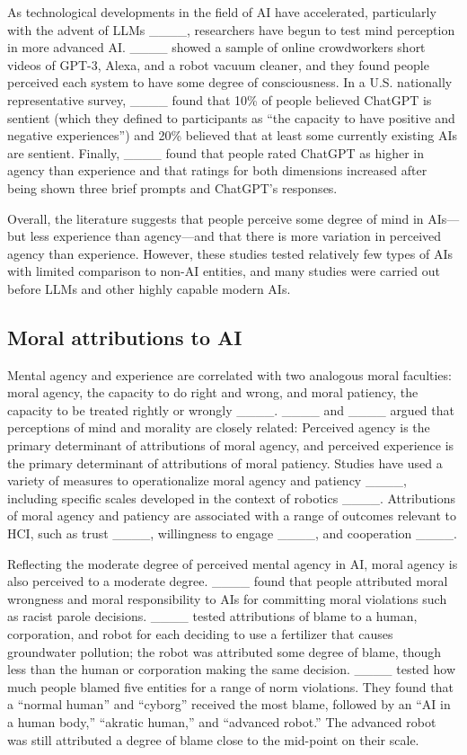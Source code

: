 As technological developments in the field of AI have accelerated, particularly with the advent of LLMs ____, researchers have begun to test mind perception in more advanced AI. ____ showed a sample of online crowdworkers short videos of GPT-3, Alexa, and a robot vacuum cleaner, and they found people perceived each system to have some degree of consciousness. In a U.S. nationally representative survey, ____ found that 10\% of people believed ChatGPT is sentient (which they defined to participants as “the capacity to have positive and negative experiences”) and 20\% believed that at least some currently existing AIs are sentient. Finally, ____ found that people rated ChatGPT as higher in agency than experience and that ratings for both dimensions increased after being shown three brief prompts and ChatGPT’s responses.

Overall, the literature suggests that people perceive some degree of mind in AIs—but less experience than agency—and that there is more variation in perceived agency than experience. However, these studies tested relatively few types of AIs with limited comparison to non-AI entities, and many studies were carried out before LLMs and other highly capable modern AIs.

\subsection{Moral attributions to AI}

Mental agency and experience are correlated with two analogous moral faculties: moral agency, the capacity to do right and wrong, and moral patiency, the capacity to be treated rightly or wrongly ____. ____ and ____ argued that perceptions of mind and morality are closely related: Perceived agency is the primary determinant of attributions of moral agency, and perceived experience is the primary determinant of attributions of moral patiency. Studies have used a variety of measures to operationalize moral agency and patiency ____, including specific scales developed in the context of robotics ____. Attributions of moral agency and patiency are associated with a range of outcomes relevant to HCI, such as trust ____, willingness to engage ____, and cooperation ____.

Reflecting the moderate degree of perceived mental agency in AI, moral agency is also perceived to a moderate degree. ____ found that people attributed moral wrongness and moral responsibility to AIs for committing moral violations such as racist parole decisions. ____ tested attributions of blame to a human, corporation, and robot for each deciding to use a fertilizer that causes groundwater pollution; the robot was attributed some degree of blame, though less than the human or corporation making the same decision. ____ tested how much people blamed five entities for a range of norm violations. They found that a “normal human” and “cyborg” received the most blame, followed by an “AI in a human body,” “akratic human,” and “advanced robot.” The advanced robot was still attributed a degree of blame close to the mid-point on their scale.

